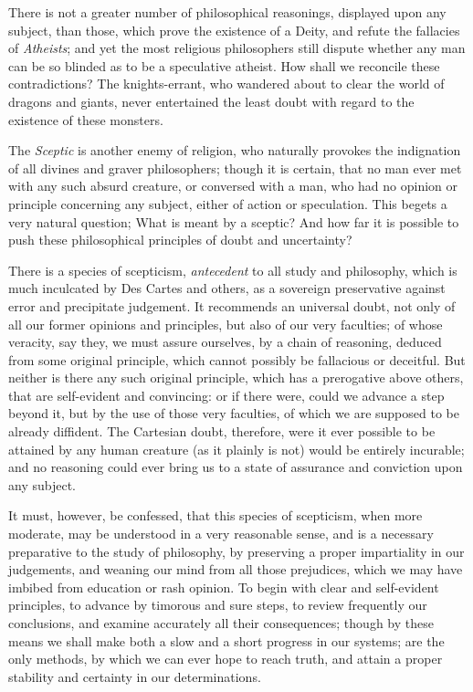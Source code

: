 \documentclass[]{article}
\begin{document}
\begin{sectionbody}

\humeparagraph  There is not a greater number of philosophical reasonings, displayed upon any subject, than those, which prove the existence of a Deity, and refute the fallacies of \emph{Atheists}; and yet the most religious philosophers still dispute whether any man can be so blinded as to be a speculative atheist. How shall we reconcile these contradictions? The knights-errant, who wandered about to clear the world of dragons and giants, never entertained the least doubt with regard to the existence of these monsters.

\humeparagraph  The \emph{Sceptic} is another enemy of religion, who naturally provokes the indignation of all divines and graver philosophers; though it is certain, that no man ever met with any such absurd creature, or conversed with a man, who had no opinion or principle concerning any subject, either of action or speculation. This begets a very natural question; What is meant by a sceptic? And how far it is possible to push these philosophical principles of doubt and uncertainty?

\humeparagraph  There is a species of scepticism, \emph{antecedent} to all study and philosophy, which is much inculcated by Des Cartes and others, as a sovereign preservative against error and precipitate judgement. It recommends an universal doubt, not only of all our former opinions and principles, but also of our very faculties; of whose veracity, say they, we must assure ourselves, by a chain of reasoning, deduced from some original principle, which cannot possibly be fallacious or deceitful. But neither is there any such original principle, which has a prerogative above others, that are self-evident and convincing: or if there were, could we advance a step beyond it, but by the use of those very faculties, of which we are supposed to be already diffident. The Cartesian doubt, therefore, were it ever possible to be attained by any human creature (as it plainly is not) would be entirely incurable; and no reasoning could ever bring us to a state of assurance and conviction upon any subject.

\humeparagraph  It must, however, be confessed, that this species of scepticism, when more moderate, may be understood in a very reasonable sense, and is a necessary preparative to the study of philosophy, by preserving a proper impartiality in our judgements, and weaning our mind from all those prejudices, which we may have imbibed from education or rash opinion. To begin with clear and self-evident principles, to advance by timorous and sure steps, to review frequently our conclusions, and examine accurately all their consequences; though by these means we shall make both a slow and a short progress in our systems; are the only methods, by which we can ever hope to reach truth, and attain a proper stability and certainty in our determinations.


\end{sectionbody}
\end{document}
